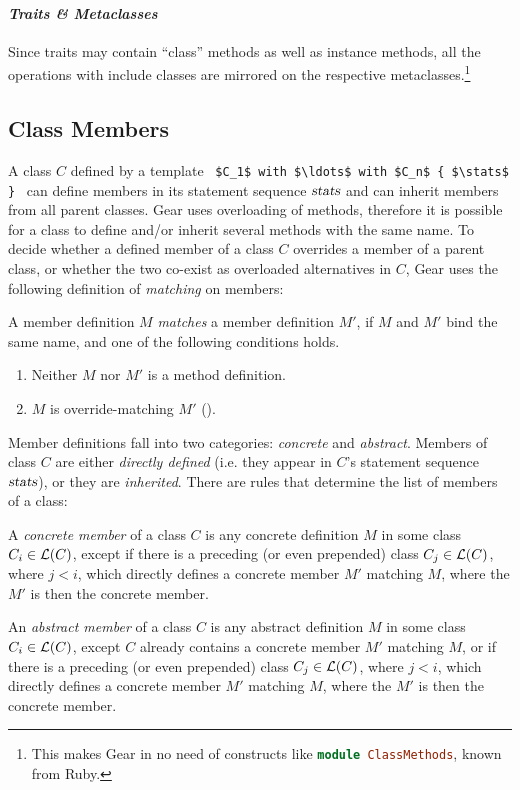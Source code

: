 \paragraph{\em Traits \& Metaclasses}
Since traits may contain ``class'' methods as well as instance methods, all the operations with include classes are mirrored on the respective metaclasses.\footnote{This makes Gear in no need of constructs like \lstinline[language=Ruby]!module ClassMethods!, known from Ruby.}





\subsection{Class Members}
\label{sec:class-members}

A class $C$ defined by a template ~\lstinline!$C_1$ with $\ldots$ with $C_n$ { $\stats$ }!~ can define members in its statement sequence $\mbox{\sl stats}$ and can inherit members from all parent classes. Gear uses overloading of methods, therefore it is possible for a class to define and/or inherit several methods with the same name. To decide whether a defined member of a class $C$ overrides a member of a parent class, or whether the two co-exist as overloaded alternatives in $C$, Gear uses the following definition of {\em matching} on members:

\begin{definition}
A member definition $M$ {\em matches} a member definition $M'$, if $M$ and $M'$ bind the same name, and one of the following conditions holds.
\begin{enumerate}
\item Neither $M$ nor $M'$ is a method definition.
\item $M$ is override-matching $M'$ (). 
\end{enumerate}
\end{definition}

Member definitions fall into two categories: {\em concrete} and {\em abstract}. Members of class $C$ are either {\em directly defined} (i.e. they appear in $C$'s statement sequence $\mbox{\sl stats}$), or they are {\em inherited}. There are rules that determine the list of members of a class:

\begin{definition}
A {\em concrete member} of a class $C$ is any concrete definition $M$ in some class $C_i \in {\cal L}(C)$, except if there is a preceding (or even prepended) class $C_j \in {\cal L}(C)$, where $j < i$, which directly defines a concrete member $M'$ matching $M$, where the $M'$ is then the concrete member. 

An {\em abstract member} of a class $C$ is any abstract definition $M$ in some class $C_i \in {\cal L}(C)$, except $C$ already contains a concrete member $M'$ matching $M$, or if there is a preceding (or even prepended) class $C_j \in {\cal L}(C)$, where $j < i$, which directly defines a concrete member $M'$ matching $M$, where the $M'$ is then the concrete member. 
\end{definition}


